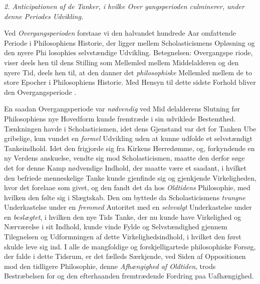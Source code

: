 \divrule
\emph{2. Anticipationen af de Tanker, i hvilke Over\-%
gangsperioden culminerer, under denne Periodes
Udvikling.}

Ved \emph{Overgangsperioden} forstaae vi den halvandet\-%
hundrede Aar omfattende Periode i Philosophiens Historie, der
ligger mellem Scholasticismens Opløsning og den nyere Phi\-%
losophies selvstændige Udvikling. Betegnelsen: Overgangspe\-%
riode, viser deels hen til dens Stilling som Mellemled mellem
Middelalderen og den nyere Tid, deels hen til, at den danner
det \emph{philosophiske} Mellemled mellem de to store Epocher i
Philosophiens Historie. Med Hensyn til dette sidste Forhold
bliver den Overgangsperiode .

En saadan Overgangsperiode var \emph{nødvendig} ved Mid\-%
delalderens Slutning før Philosophiens nye Hovedform kunde
fremtræde i sin udviklede Bestemthed. Tænkningen havde i
Scholasticismen, idet dens Gjenstand var det for Tanken Ube\-%
gribelige, kun vundet en \emph{formel} Udvikling uden at kunne
udfolde et selvstændigt Tankeindhold. Idet den frigjorde sig
fra Kirkens Herredømme, og, forkyndende en ny Verdens\-%
anskuelse, vendte sig mod Scholasticismen, maatte den
derfor søge det for denne Kamp nødvendige Indhold, der
maatte være et saadant, i hvilket den befriede menneskelige
Tanke kunde gjenfinde sig og gjenkjende Virkeligheden, hvor
det forelaae som givet, og den fandt det da hos \emph{Oldtidens}
Philosophie, med hvilken den følte sig i Slægtskab. Den om\-%
byttede da Scholasticismens \emph{tvungne} Underkastelse under en
\emph{fremmed} Autoritet med en \emph{selvvalgt} Underkastelse under
en \emph{beslægtet}, i hvilken den nye Tids Tanke, der nu kunde
have Virkelighed og Nærværelse i sit Indhold, kunde vinde
Fylde og Selvstændighed gjennem Tilegnelsen og Udformningen
af dette Virkelighedsindhold, i hvilket den først skulde leve sig
ind. I alle de mangfoldige og forskjelligartede philosophiske
Forsøg, der falde i dette Tidsrum, er det fælleds Særkjende,
ved Siden af Oppositionen mod den tidligere Philosophie, denne
 \emph{Afhængighed af Oldtiden}, trods Bestræbelsen for og den
efterhaanden fremtrædende Fordring paa Uafhængighed.


